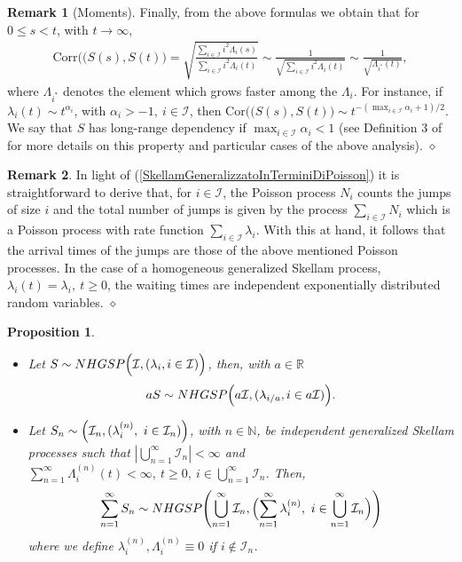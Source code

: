 \documentclass[12pt, twoside, english, headsepline]{article}
\newtheorem{proposition}{Proposition}[section] %
\theoremstyle{definition} %
\newtheorem{remark}{Remark}[section] %
\numberwithin{equation}{section} %
\begin{document}
\begin{remark}[Moments]
Finally, from the above formulas we obtain that for $0\le s<t$, with $t\rightarrow\infty$,
\begin{align}
\text{Corr}\bigl((S(s),S(t)\bigr)  =\sqrt{\frac{\sum_{i\in\mathcal{I}} i^2\Lambda_i(s)}{\sum_{i\in\mathcal{I}} i^2\Lambda_i(t)}} \sim \frac{1}{\sqrt{\sum_{i\in\mathcal{I}} i^2\Lambda_i(t)}}\sim \frac{1}{\sqrt{\Lambda_{i^*}(t)}},
\end{align}
where $\Lambda_{i^*}$ denotes the element which grows faster among the $\Lambda_i$. 
For instance, if $\lambda_i(t) \sim t^{\alpha_i}$, with $\alpha_i>-1,\ i\in\mathcal{I}$, then $\text{Cor}\bigl((S(s),S(t)\bigr)\sim t^{-(\max_{i\in\mathcal{I}} \alpha_i + 1)/2}$. We say that $S$ has long-range dependency if $\max_{i\in\mathcal{I}} \alpha_i<1$ (see Definition 3 of \cite{GKL2020} for more details on this property and particular cases of the above analysis).
\hfill$\diamond$
\end{remark}


\begin{remark}\label{remarkPoissonContaSaltiTempiDiArrivo}
In light of (\ref{SkellamGeneralizzatoInTerminiDiPoisson}) it is straightforward to derive that, for $i\in\mathcal{I}$, the Poisson process $N_i$ counts the jumps of size $i$ and the total number of jumps is given by the process $\sum_{i\in\mathcal{I}} N_i $ which is a Poisson process with rate function $\sum_{i\in\mathcal{I}} \lambda_i$.
With this at hand, it follows that the arrival times of the jumps are those of the above mentioned Poisson processes. In the case of a homogeneous generalized Skellam process, $\lambda_i(t) = \lambda_i,\ t\ge0$, the waiting times are independent exponentially distributed random variables.
\hfill$\diamond$
\end{remark}

\begin{proposition}\label{proposizioneCombinazioneLineareProcessiSkellamGenerlizzati}
\begin{itemize}
\item[($i$)] Let $S\sim NHGSP\Bigl(\mathcal{I}, (\lambda_i, i\in \mathcal{I} )\Bigr)$, then, with $a\in\mathbb{R}$
\begin{equation}\label{tesiSkellamPerCoefficiente}
aS\sim NHGSP\Bigl(a\mathcal{I}, (\lambda_{i/a}, i\in a\mathcal{I} )\Bigr).
\end{equation}
\item[($ii$)] Let $S_n\sim \Bigl(\mathcal{I}_n, (\lambda_i^{(n)},\ i\in \mathcal{I}_n )\Bigr)$, with $n\in\mathbb{N}$, be independent generalized Skellam processes such that $|\bigcup_{n=1}^\infty  \mathcal{I}_n |<\infty$ and $\sum_{n=1}^\infty \Lambda^{(n)}_i(t) <\infty,\  t\ge0, \ i\in\bigcup_{n=1}^\infty  \mathcal{I}_n$. Then,
\begin{equation}
\sum_{n=1}^\infty S_n\sim NHGSP\Biggl(\bigcup_{n=1}^\infty\mathcal{I}_n, \Bigl(\sum_{n=1}^\infty\lambda_i^{(n)},\ i\in \bigcup_{n=1}^\infty\mathcal{I}_n \Bigr)\Biggr)
\end{equation}
 where we define $\lambda_i^{(n)}, \Lambda_i^{(n)}\equiv 0 $ if  $i\not\in\mathcal{I}_n$.
\end{itemize}
\end{proposition}
\end{document}

